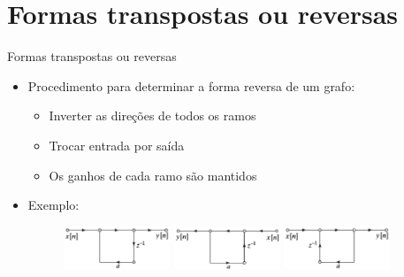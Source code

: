 \section{Formas transpostas ou reversas}
\begin{slide}{Formas transpostas ou reversas}
	\begin{itemize}
		\item Procedimento para determinar a forma reversa de um grafo:
		\begin{itemize}
			\item Inverter as direções de todos os ramos
			\item Trocar entrada por saída
			\item Os ganhos de cada ramo são mantidos
		\end{itemize}
		\item Exemplo:
   			\begin{figure}
       				\centering
        			\includegraphics[width = 0.3\textwidth]{figs/transposed1.eps}
        			\includegraphics[width = 0.3\textwidth]{figs/transposed2.eps}
        			\includegraphics[width = 0.3\textwidth]{figs/transposed3.eps}
   			\end{figure}
	\end{itemize}
\end{slide}

